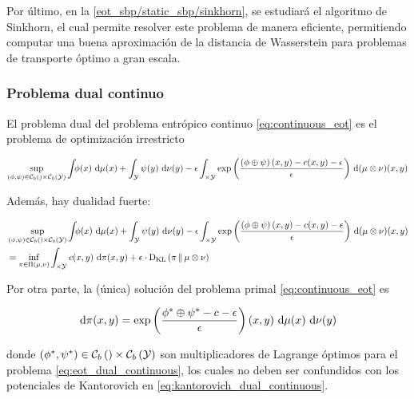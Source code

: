 Por último, en la \autoref{eot_sbp/static_sbp/sinkhorn}, se estudiará el algoritmo de Sinkhorn, el cual permite resolver este problema de manera eficiente, permitiendo computar una buena aproximación de la distancia de Wasserstein para problemas de transporte óptimo a gran escala.

\subsubsection{Problema dual continuo}

\begin{prop}
	El problema dual del problema entrópico continuo \eqref{eq:continuous_eot} es el problema de optimización irrestricto

	\begin{equation}
		\label{eq:eot_dual_continuous}
		\sup_{(\phi,\psi)\in \mathcal{C}_b\left(\right)\times \mathcal{C}_b\left(\mathcal{Y}\right)}
		\int_{} \phi(x) \,\operatorname{d}\!\mu(x) + \int_{\mathcal{Y}} \psi(y) \,\operatorname{d}\!\nu(y)
		- \epsilon \int_{\times\mathcal{Y}} \exp\left(\frac{\left(\phi\oplus\psi\right)(x,y) - c(x,y) - \epsilon}{\epsilon}\right) \,\operatorname{d}\!\,(\mu\otimes\nu)(x,y)
	\end{equation}

	Además, hay dualidad fuerte:

	\begin{align*}
		 & \sup_{(\phi,\psi)\in \mathcal{C}_b\left(\right)\times \mathcal{C}_b\left(\mathcal{Y}\right)}
		 \int_{} \phi(x) \,\operatorname{d}\!\mu(x) + \int_{\mathcal{Y}} \psi(y) \,\operatorname{d}\!\nu(y)
		 - \epsilon \int_{\times\mathcal{Y}} \exp\left(\frac{\left(\phi\oplus\psi\right)(x,y) - c(x,y) - \epsilon}{\epsilon}\right) \,\operatorname{d}\!\,(\mu\otimes\nu)(x,y) \\
		 & =\inf_{\pi\in\Pi(\mu,\nu)}  \int_{\times\mathcal{Y}} c(x,y) \,\operatorname{d}\!\pi(x,y) + \epsilon\cdot \operatorname{D_{KL}}\left(\pi\,\|\,\mu\otimes\nu\right)
	\end{align*}

	Por otra parte, la (única) solución del problema primal \eqref{eq:continuous_eot} es

	\begin{equation*}
		\,\operatorname{d}\!\pi(x,y) = \exp\left(\frac{\phi^* \oplus \psi^* - c - \epsilon}{\epsilon}\right)(x,y) \,\operatorname{d}\!\mu(x)\,\operatorname{d}\!\nu(y)
	\end{equation*}

	donde $(\phi^*,\psi^*)\in \mathcal{C}_b\left(\right)\times \mathcal{C}_b\left(\mathcal{Y}\right)$ son multiplicadores de Lagrange óptimos para el problema \eqref{eq:eot_dual_continuous}, los cuales no
	deben ser confundidos con los potenciales de Kantorovich en \eqref{eq:kantorovich_dual_continuous}.
\end{prop}

